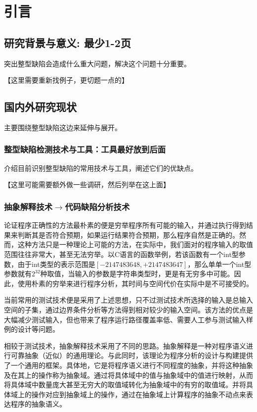 
\chapter{引言}

 \section{研究背景与意义: 最少1-2页}
 
 突出整型缺陷会造成什么重大问题，解决这个问题十分重要。
 
 【这里需要重新找例子，更切题一点的】
 
 \section{国内外研究现状}
 
 主要围绕整型缺陷这边来延伸与展开。
 
 \subsection{整型缺陷检测技术与工具：工具最好放到后面}
 
 介绍目前识别整型缺陷的常用技术与工具，阐述它们的优缺点。
 
 【这里可能需要额外做一些调研，然后列举在这上面】
 
 \subsection{抽象解释技术$\rightarrow$代码缺陷分析技术}
 
论证程序正确性的方法最朴素的便是穷举程序所有可能的输入，并通过执行得到结果来判断其是否符合预期，如果运行结果符合预期，那么程序自然是正确的。然而，这种方法只是一种理论上可能的方法，在实际中，我们面对的程序输入的取值范围往往非常大，甚至无法穷举。以C语言的函数举例，若该函数有一个int型参数，由于int类型的表示范围是$ \left[  -2147483648, +2147483647 \right] $，那么单单一个int型参数就有$ 2^{32}  $种取值，当输入的参数是字符串类型时，更是有无穷多中可能。因此，使用朴素的穷举来进行程序分析，其时间与空间代价在实际中是不可接受的。
 
 当前常用的测试技术便是采用了上述思想，只不过测试技术所选择的输入是总输入空间的子集，通过边界条件分析等方法得到相对较少的输入空间。该方法的优点是大幅减少测试输入，但也带来了程序运行路径覆盖率低、需要人工参与测试输入样例的设计等问题。
 
  相较于测试技术，抽象解释技术采用了不同的思路。抽象解释是一种对程序语义进行可靠抽象（近似）的通用理论\cite{cousot1977abstract}。与此同时，该理论为程序分析的设计与构建提供了一个通用的框架\cite{cousot1979systematic}。具体地，它是将程序语义进行不同程度的抽象，并将这种抽象及在其上的操作称为抽象域。通过将具体域中的值与抽象域中的值进行映射，从而将具体域中数量庞大甚至无穷大的取值域转化为抽象域中的有穷的取值域。并将具体域上的操作对应到抽象域上的操作，通过在抽象域上计算程序的抽象不动点来表达程序的抽象语义。
 
